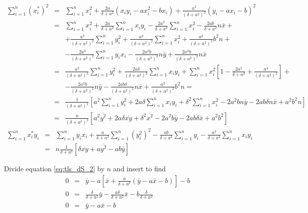 \documentclass[a4paper,11pt,onepage]{article}
\begin{document}
\begin{eqnarray}
 \sum_{i=1}^n \left( x_i^*\right)^2 &=& \sum_{i=1}^n x_i^2 + \frac{2a}{\delta+a^2} \left( x_i y_i -a x_i^2 -b x_i \right) + \frac{a^2}{(\delta+a^2)^2} \left( y_i - a x_i -b \right)^2 \nonumber\\
 &=& \sum_{i=1}^n x_i^2 + \frac{2a}{\delta+a^2} \sum_{i=1}^n x_i y_i - \frac{2a^2 }{\delta+a^2} \sum_{i=1}^n x_i^2 - \frac{2ab}{\delta+a^2} n\bar x + \nonumber\\
 &&+ \frac{a^2}{(\delta+a^2)^2} \sum_{i=1}^n y_i^2 + \frac{a^4}{(\delta+a^2)^2} \sum_{i=1}^n x_i^2 + \frac{a^2}{(\delta+a^2)^2} b^2 n + \nonumber\\
 &&- \frac{2a^3}{(\delta+a^2)^2} \sum_{i=1}^n y_i x_i - \frac{2a^2b}{(\delta+a^2)^2} n \bar y + \frac{2a^3b}{(\delta+a^2)^2} n \bar x \nonumber \\
 &=& \frac{a^2}{(\delta+a^2)^2} \sum_{i=1}^n y_i^2 +
 \frac{2a \delta}{(\delta+a^2)^2} \sum_{i=1}^n x_i y_i   + 
 \sum_{i=1}^n x_i^2 \left[ 1 - \frac{2a^2 }{\delta+a^2}  + \frac{a^4}{(\delta+a^2)^2} \right] + \nonumber\\
&& - \frac{2a^2b}{(\delta+a^2)^2} n \bar y  - \frac{2ab\delta}{(\delta+a^2)^2} n \bar x + \frac{a^2}{(\delta+a^2)^2} b^2 n = \nonumber\\
&=& \frac1{(\delta+a^2)^2} \left[ a^2 \sum_{i=1}^n y_i^2 + 2a \delta \sum_{i=1}^n x_i y_i + \delta^2\sum_{i=1}^n x_i^2
-2 a^2b n \bar y  - 2 ab \delta n \bar x + a^2 b^2 n \right] \nonumber \\
&=& \frac{n}{(\delta+a^2)^2} \left[ a^2 \overline{ y^2}  + 2a \delta \overline{xy} + \delta^2 \overline{x^2} 
-2 a^2b  \bar y  - 2 ab \delta \bar x + a^2 b^2  \right] \label{eq:tls_sum_xstar^2}
\end{eqnarray}
\begin{eqnarray*}
 \sum_{i=1}^n x_i^* y_i &=& 
 \sum_{i=1}^n  y_i  x_i + \frac{a}{\delta+a^2}\sum_{i=1}^n \left(y_i^2\right)^2 - \frac{ab}{\delta+a^2}\sum_{i=1}^n y_i - \frac{a^2}{\delta+a^2} \sum_{i=1}^n x_i y_i \\
 &=& n \frac1{\delta+a^2} \left [\delta \overline{xy} + a \overline{y^2} - ab\bar y \right]
\end{eqnarray*}

Divide equation \eqref{eq:tls_dS_2} by $n$ and insert to find
\begin{eqnarray}
 0 &=& \bar y - a \left[  \bar x + \frac{a}{\delta+a^2} \left(  \bar y - a  \bar x - b\right) \right] -b \nonumber \\
  0 &=& \frac{\delta}{\delta+a^2} \bar y - \frac{a \delta}{\delta+a^2} \bar x - b \frac{\delta}{\delta+a^2} \nonumber\\
  0 &=& \bar y - a \bar x -b \label{eq:tls_xbarybar}
\end{eqnarray}
\end{document}
